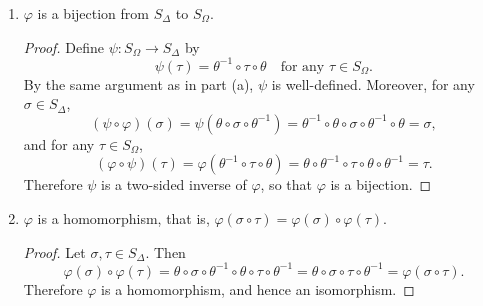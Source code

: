 \begin{enumerate}
\begin{proof}
    Suppose $a,b\in\Omega$ are such that
    $\varphi(\sigma)(a) = \varphi(\sigma)(b)$. Since $\theta$ is an
    injection, this implies that
    $\sigma\circ\theta^{-1}(a) = \sigma\circ\theta^{-1}(b)$. But
    $\sigma$ is also an injection, so
    $\theta^{-1}(a) = \theta^{-1}(b)$ and so $a = b$. This shows that
    $\varphi(\sigma)$ is an injection. But an injective mapping from a
    set to itself must also be surjective. Hence $\varphi(\sigma)$ is
    a bijection from $\Omega$ to itself, that is, $\varphi(\sigma)$ is
    a permutation of $\Omega$.
  \end{proof}
\item $\varphi$ is a bijection from $S_\Delta$ to $S_\Omega$.
  \begin{proof}
    Define $\psi\colon S_\Omega\to S_\Delta$ by
    \begin{equation*}
      \psi(\tau) = \theta^{-1}\circ\tau\circ\theta
      \quad\text{for any $\tau\in S_\Omega$}.
    \end{equation*}
    By the same argument as in part (a), $\psi$ is
    well-defined. Moreover, for any $\sigma\in S_\Delta$,
    \begin{equation*}
      (\psi\circ\varphi)(\sigma) = \psi(\theta\circ\sigma\circ\theta^{-1})
      = \theta^{-1}\circ\theta\circ\sigma\circ\theta^{-1}\circ\theta
      = \sigma,
    \end{equation*}
    and for any $\tau\in S_\Omega$,
    \begin{equation*}
      (\varphi\circ\psi)(\tau) = \varphi(\theta^{-1}\circ\tau\circ\theta)
      = \theta\circ\theta^{-1}\circ\tau\circ\theta\circ\theta^{-1}
      = \tau.
    \end{equation*}
    Therefore $\psi$ is a two-sided inverse of $\varphi$, so that
    $\varphi$ is a bijection.
  \end{proof}
\item $\varphi$ is a homomorphism, that is,
  $\varphi(\sigma\circ\tau) = \varphi(\sigma)\circ\varphi(\tau)$.
  \begin{proof}
    Let $\sigma,\tau\in S_\Delta$. Then
    \begin{equation*}
      \varphi(\sigma)\circ\varphi(\tau)
      = \theta\circ\sigma\circ\theta^{-1}\circ\theta\circ\tau\circ\theta^{-1}
      = \theta\circ\sigma\circ\tau\circ\theta^{-1}
      = \varphi(\sigma\circ\tau).
    \end{equation*}
    Therefore $\varphi$ is a homomorphism, and hence an isomorphism.
  \end{proof}
\end{enumerate}

